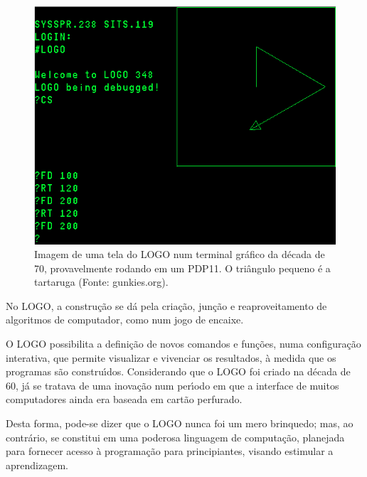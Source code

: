 \documentclass[
12pt,		%
openright,	%
twoside,  %
a4paper,			%
chapter=TITLE,		%
english,			%
french,				%
spanish,			%
brazil				%
]{USPSC-classe/USPSC}
\begin{document}
\begin{figure}[max size={\textwidth}{\textheight}]
\begin{minipage}[b]{0.4\linewidth}
                \includegraphics[width=1.0\linewidth]{../../imagens/logo-PDP11.png}
                \caption{Imagem de uma tela do LOGO num terminal gr\'afico da d\'ecada de 70, provavelmente rodando em um PDP11. O tri\^angulo pequeno \'e a tartaruga (Fonte: gunkies.org).}
                \label{ca83b217b58f57e503ff496c6c6f47bee5dc77cd}
\end{minipage}
\hspace{0.5cm}
\end{figure}



No LOGO, a constru\c{c}\~ao se d\'a pela cria\c{c}\~ao, jun\c{c}\~ao e reaproveitamento de algoritmos de computador, como num jogo de encaixe.








O LOGO possibilita a defini\c{c}\~ao de novos comandos e fun\c{c}\~oes, numa configura\c{c}\~ao interativa, que permite visualizar e vivenciar os resultados, \`a medida que os programas s\~ao constru\'{\i}dos. Considerando que o LOGO foi criado na d\'ecada de 60, j\'a se tratava de uma inova\c{c}\~ao num per\'{\i}odo em que a interface de muitos computadores ainda era baseada em cart\~ao perfurado.








Desta forma, pode-se dizer que o LOGO nunca foi um mero brinquedo; mas, ao contr\'ario, se constitui em uma poderosa linguagem de computa\c{c}\~ao, planejada para fornecer acesso \`a programa\c{c}\~ao para principiantes, visando estimular a aprendizagem.
\end{document}
